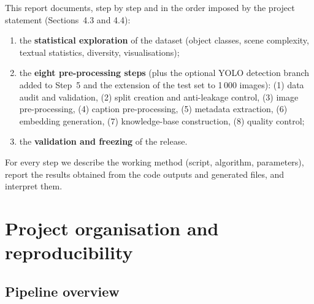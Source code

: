 \documentclass[11pt,a4paper]{article}
\renewcommand{\_}{\textunderscore\allowbreak{}}
\begin{document}
This report documents, step by step and in the order imposed by the project statement (Sections~4.3 and 4.4):
\begin{enumerate}[nosep]
  \item the \textbf{statistical exploration} of the dataset (object classes, scene complexity, textual statistics, diversity, visualisations);
  \item the \textbf{eight pre-processing steps} (plus the optional YOLO detection branch added to Step~5 and the extension of the test set to 1\,000 images): (1) data audit and validation, (2) split creation and anti-leakage control, (3) image pre-processing, (4) caption pre-processing, (5) metadata extraction, (6) embedding generation, (7) knowledge-base construction, (8) quality control;
  \item the \textbf{validation and freezing} of the release.
\end{enumerate}
For every step we describe the working method (script, algorithm, parameters), report the results obtained from the code outputs and generated files, and interpret them.







\section{Project organisation and reproducibility}

\subsection{Pipeline overview}
\end{document}
